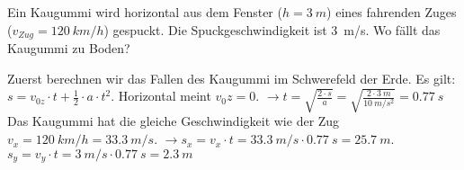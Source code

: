 
\begin{aufgabe}
Ein Kaugummi wird horizontal aus dem Fenster ($h=\SI{3}{m}$) eines fahrenden Zuges ($v_{Zug}=\SI{120}{km/h}$) gespuckt.
Die Spuckgeschwindigkeit ist \SI{3}{m/s}.
Wo fällt das Kaugummi zu Boden?


\begin{loesung}
Zuerst berechnen wir das Fallen des Kaugummi im Schwerefeld der Erde.
Es gilt: $s=v_{0z}\cdot t + \frac{1}{2}\cdot a\cdot t^2$. Horizontal meint $v_0z=0$.
$\to t=\sqrt{\frac{2\cdot s}{a}}=\sqrt{\frac{2\cdot \SI{3}{m}}{\SI{10}{m/s^2}}}=\SI{0.77}{s}$
Das Kaugummi hat die gleiche Geschwindigkeit wie der Zug $v_x=\SI{120}{km/h}=\SI{33.3}{m/s}$.
$\to s_x=v_x\cdot t= \SI{33.3}{m/s}\cdot\SI{0.77}{s}=\SI{25.7}{m}$.
    $s_y=v_y\cdot t =\SI{3}{m/s}\cdot \SI{0.77}{s}=\SI{2.3}{m}$

\end{loesung}
\end{aufgabe}
